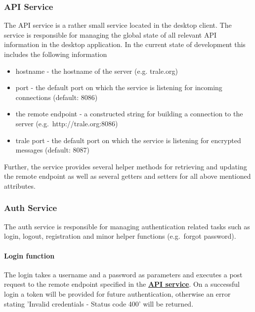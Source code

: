 \subsubsection{API Service}\label{subsubsec:api-service}
The API service is a rather small service located in the desktop client.
The service is responsible for managing the global state of all relevant API information in the desktop application.
In the current state of development this includes the following information

\begin{itemize}
    \item hostname - the hostname of the server (e.g. trale.org)
    \item port - the default port on which the service is listening for incoming connections (default: 8086)
    \item the remote endpoint - a constructed string for building a connection to the server (e.g.\ http://trale.org:8086)
    \item trale port - the default port on which the service is listening for encrypted messages (default: 8087)
\end{itemize}

Further, the service provides several helper methods for retrieving and updating the remote endpoint as well as several
getters and setters for all above mentioned attributes.

\subsubsection{Auth Service}\label{subsubsec:auth-service}
The auth service is responsible for managing authentication related tasks such as login, logout, registration and
minor helper functions (e.g.\ forgot password).

\paragraph{Login function}
The login takes a username and a password as parameters and executes a post request to the remote endpoint specified in
the \textbf{\hyperref[subsubsec:api-service]{API service}}.
On a successful login a token will be provided for future authentication, otherwise an error stating 'Invalid
credentials - Status code 400' will be returned.


